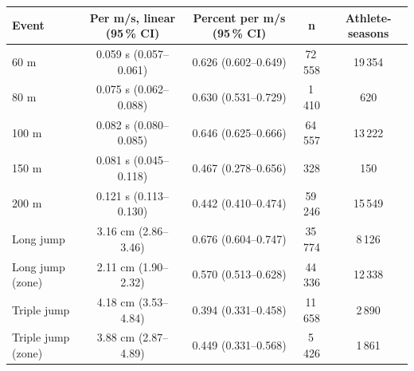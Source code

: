 \begin{tabular}{lcccc}
\toprule
Event & Per m/s, linear (95\,\% CI) & Percent per m/s (95\,\% CI) & n & Athlete-seasons \\
\midrule
60 m & 0.059 s (0.057--0.061) & 0.626 (0.602--0.649) & 72\,558 & 19\,354 \\
80 m & 0.075 s (0.062--0.088) & 0.630 (0.531--0.729) & 1\,410 & 620 \\
100 m & 0.082 s (0.080--0.085) & 0.646 (0.625--0.666) & 64\,557 & 13\,222 \\
150 m & 0.081 s (0.045--0.118) & 0.467 (0.278--0.656) & 328 & 150 \\
200 m & 0.121 s (0.113--0.130) & 0.442 (0.410--0.474) & 59\,246 & 15\,549 \\
Long jump & 3.16 cm (2.86--3.46) & 0.676 (0.604--0.747) & 35\,774 & 8\,126 \\
Long jump (zone) & 2.11 cm (1.90--2.32) & 0.570 (0.513--0.628) & 44\,336 & 12\,338 \\
Triple jump & 4.18 cm (3.53--4.84) & 0.394 (0.331--0.458) & 11\,658 & 2\,890 \\
Triple jump (zone) & 3.88 cm (2.87--4.89) & 0.449 (0.331--0.568) & 5\,426 & 1\,861 \\
\bottomrule
\end{tabular}
